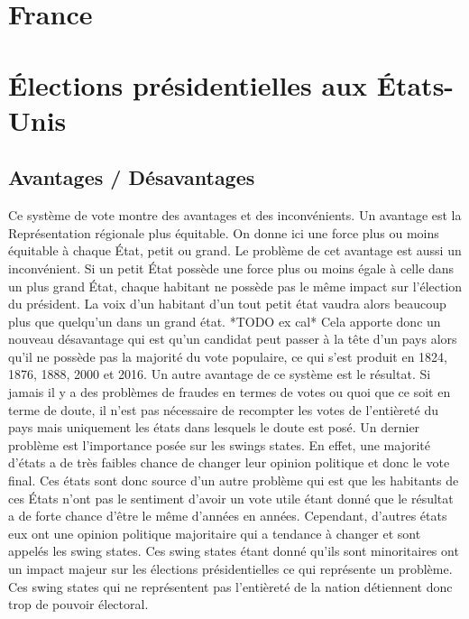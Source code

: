 \documentclass[12pt,a4paper]{report}
\begin{document}
\section{France} %

\section{Élections présidentielles aux États-Unis}

\subsection{Avantages / Désavantages} %
Ce système de vote montre des avantages et des inconvénients.
Un avantage est la Représentation régionale plus équitable.
On donne ici une force plus ou moins équitable à chaque État, petit ou grand.
Le problème de cet avantage est aussi un inconvénient.
Si un petit État possède une force plus ou moins égale à celle dans un plus grand État, chaque habitant ne possède pas le même impact sur l'élection du président.
La voix d’un habitant d’un tout petit état vaudra alors beaucoup plus que quelqu’un dans un grand état. *TODO ex cal*
Cela apporte donc un nouveau désavantage qui est qu’un candidat peut passer à la tête d’un pays alors qu’il ne possède pas la majorité du vote populaire, ce qui s’est produit en 1824, 1876, 1888, 2000 et 2016.
Un autre avantage de ce système est le résultat.
Si jamais il y a des problèmes de fraudes en termes de votes ou quoi que ce soit en terme de doute, il n’est pas nécessaire de recompter les votes de l'entièreté du pays mais uniquement les états dans lesquels le doute est posé.
Un dernier problème est l’importance posée sur les swings states.
En effet, une majorité d’états a de très faibles chance de changer leur opinion politique et donc le vote final.
Ces états sont donc source d’un autre problème qui est que les habitants de ces États n’ont pas le sentiment d’avoir un vote utile étant donné que le résultat a de forte chance d’être le même d’années en années.
Cependant, d’autres états eux ont une opinion politique majoritaire qui a tendance à changer et sont appelés les swing states.
Ces swing states étant donné qu’ils sont minoritaires ont un impact majeur sur les élections présidentielles ce qui représente un problème.
Ces swing states qui ne représentent pas l'entièreté de la nation détiennent donc trop de pouvoir électoral.
\nocite{greelane:eleccoll}
\nocite{gov:fedpapers68}
\end{document}

